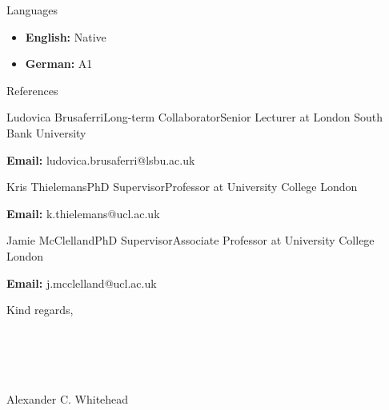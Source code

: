 \documentclass{cv}
\begin{document}
    \begin{rSection}{Languages}
        \item \begin{itemize}
            \item \textbf{English:} Native
            \item \textbf{German:} A1
        \end{itemize} 
    \end{rSection}

    \begin{rSection}{References}
        \item \begin{rSubsection}{Ludovica Brusaferri}{Long-term Collaborator}{Senior Lecturer at London South Bank University}{}
            \item \textbf{Email:} ludovica.brusaferri@lsbu.ac.uk
        \end{rSubsection}
        
        \item \begin{rSubsection}{Kris Thielemans}{PhD Supervisor}{Professor at University College London}{}
            \item \textbf{Email:} k.thielemans@ucl.ac.uk
        \end{rSubsection}

        \item \begin{rSubsection}{Jamie McClelland}{PhD Supervisor}{Associate Professor at University College London}{}
            \item \textbf{Email:} j.mcclelland@ucl.ac.uk
        \end{rSubsection}
    \end{rSection}
    
    \begin{rSection}{}
        \item Kind regards,
        \\
        \\
        \\
        \\
        \\
        \item Alexander C. Whitehead
    \end{rSection}

    \newpage
\end{document}

